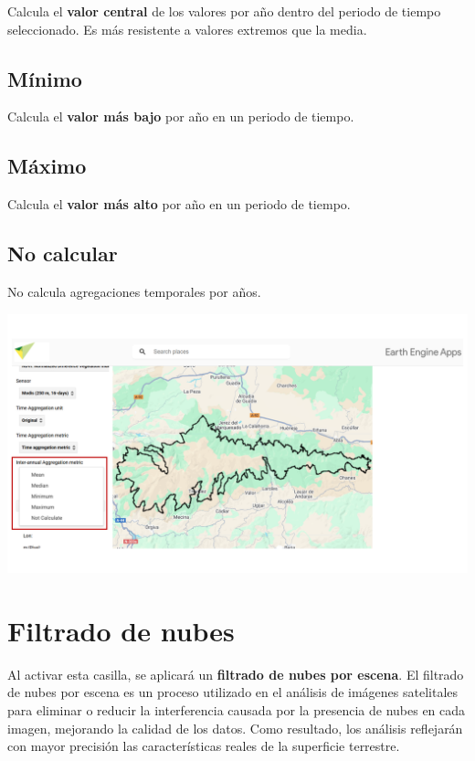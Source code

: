 \documentclass[
]{book}
\begin{document}
Calcula el \textbf{valor central} de los valores por año dentro del periodo de tiempo seleccionado. Es más resistente a valores extremos que la media.

\section{\texorpdfstring{\textbf{Mínimo}}{Mínimo}}\label{muxednimo-1}

Calcula el \textbf{valor más bajo} por año en un periodo de tiempo.

\section{\texorpdfstring{\textbf{Máximo}}{Máximo}}\label{muxe1ximo-1}

Calcula el \textbf{valor más alto} por año en un periodo de tiempo.

\section{\texorpdfstring{\textbf{No calcular}}{No calcular}}\label{no-calcular}

No calcula agregaciones temporales por años.

\includegraphics{assets/interannualAggregation.png}

\chapter{Filtrado de nubes}\label{filtrado-nubes}

Al activar esta casilla, se aplicará un \textbf{filtrado de nubes por escena}. El filtrado de nubes por escena es un proceso utilizado en el análisis de imágenes satelitales para eliminar o reducir la interferencia causada por la presencia de nubes en cada imagen, mejorando la calidad de los datos. Como resultado, los análisis reflejarán con mayor precisión las características reales de la superficie terrestre.
\end{document}
